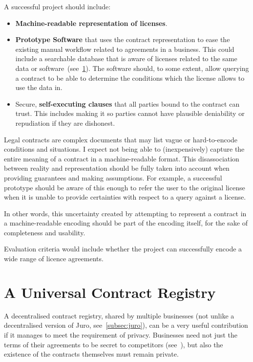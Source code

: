 A successful project should include:
\begin{itemize}
    \item \textbf{Machine-readable representation of licenses}.
    \item \textbf{Prototype Software} that uses the contract representation to ease the existing
    manual workflow related to agreements in a business.
    This could include a searchable database that is aware of licenses related to the same data or
    software~(see~\ref{sec:contract-registry}).
    The software should, to some extent, allow querying a contract to be able to determine the
    conditions which the license allows to use the data in.
    \item Secure, \textbf{self-executing clauses} that all parties bound to the contract can trust.
    This includes making it so parties cannot have plausible deniability or repudiation if they are
    dishonest.
\end{itemize}

Legal contracts are complex documents that may list vague or hard-to-encode conditions and
situations.
I expect not being able to (inexpensively) capture the entire meaning of a contract in a
machine-readable format.
This disassociation between reality and representation should be fully taken into account when
providing guarantees and making assumptions.
For example, a successful prototype should be aware of this enough to refer the user to the original
license when it is unable to provide certainties with respect to a query against a license.

In other words, this uncertainty created by attempting to represent a contract in a machine-readable
encoding should be part of the encoding itself, for the sake of completeness and usability.

Evaluation criteria would include whether the project can successfully encode a wide range of
licence agreements.


\section{A Universal Contract Registry}\label{sec:contract-registry}

A decentralised contract registry, shared by multiple businesses (not unlike a decentralised version
of Juro, see~\ref{subsec:juro}), can be a very useful contribution if it manages to meet the
requirement of privacy.
Businesses need not just the terms of their agreements to be secret to competitors
(see~\cite[]{economistIU2016licence}), but also the existence of the contracts
themselves must remain private.
